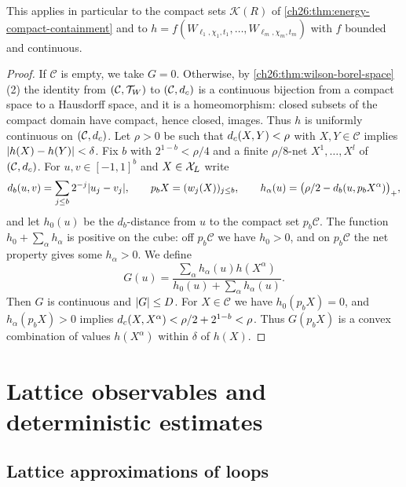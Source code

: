 This applies in particular to the compact sets $\mathcal K(R)$ of \cref{ch26:thm:energy-compact-containment} and to $h=f(W_{\ell_1,\chi_1,t_1},\dots,W_{\ell_m,\chi_m,t_m})$ with $f$ bounded and continuous.

\begin{proof}
If $\mathcal C$ is empty, we take $G=0$. Otherwise, by \cref{ch26:thm:wilson-borel-space}(2) the identity from $(\mathcal C,\mathcal T_W)$ to $(\mathcal C,d_c)$ is a continuous bijection from a compact space to a Hausdorff space, and it is a homeomorphism: closed subsets of the compact domain have compact, hence closed, images. Thus $h$ is uniformly continuous on $(\mathcal C,d_c)$. Let $\rho>0$ be such that $d_c(X,Y)<\rho$ with $X,Y\in\mathcal C$ implies $\lvert h(X)-h(Y)\rvert<\delta$. Fix $b$ with $2^{1-b}<\rho/4$ and a finite $\rho/8$-net $X^1,\dots,X^l$ of $(\mathcal C,d_c)$. For $u,v\in[-1,1]^b$ and $X\in\mathcal X_L$ write
\[
 d_b(u,v)=\sum_{j\le b}2^{-j}\lvert u_j-v_j\rvert,\qquad p_bX=(w_j(X))_{j\le b},\qquad h_\alpha(u)=\bigl(\rho/2-d_b(u,p_bX^\alpha)\bigr)_+ ,
\]
and let $h_0(u)$ be the $d_b$-distance from $u$ to the compact set $p_b\mathcal C$. The function $h_0+\sum_\alpha h_\alpha$ is positive on the cube: off $p_b\mathcal C$ we have $h_0>0$, and on $p_b\mathcal C$ the net property gives some $h_\alpha>0$. We define
\[
 G(u)=\frac{\sum_\alpha h_\alpha(u)h(X^\alpha)}{h_0(u)+\sum_\alpha h_\alpha(u)} .
\]
Then $G$ is continuous and $\lvert G\rvert\le D$. For $X\in\mathcal C$ we have $h_0(p_bX)=0$, and $h_\alpha(p_bX)>0$ implies $d_c(X,X^\alpha)<\rho/2+2^{1-b}<\rho$. Thus $G(p_bX)$ is a convex combination of values $h(X^\alpha)$ within $\delta$ of $h(X)$.
\end{proof}

\section{Lattice observables and deterministic estimates}\label{ch26:sec:lattice-observables}

\subsection{Lattice approximations of loops}

